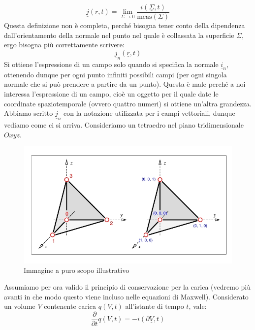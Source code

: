 \documentclass{book}
\begin{document}
        \begin{equation}
            \underline{j}(\underline{r}, t) = \lim_{\Sigma \to 0} \frac{i(\underline{\Sigma},t)}{\textrm{meas}(\Sigma)}
        \end{equation}
        Questa definizione non è completa, perché bisogna tener conto della dipendenza dall'orientamento della normale nel punto nel quale è collassata la superficie $\Sigma$, ergo bisogna più correttamente scrivere:
        \begin{equation}
            \underline{j}_{n}(\underline{r},t)
        \end{equation}
        Si ottiene l'espressione di un campo solo quando si specifica la normale $\underline{i}_{n}$, ottenendo dunque per ogni punto infiniti possibili campi (per ogni singola normale che si può prendere a partire da un punto). Questa è male perché a noi interessa l'espressione di un campo, cioè un oggetto per il quale date le coordinate spaziotemporale (ovvero quattro numeri) si ottiene un'altra grandezza. \\
        Abbiamo scritto $\underline{j}_{n}$ con la notazione utilizzata per i campi vettoriali, dunque vediamo come ci si arriva. Consideriamo un tetraedro nel piano tridimensionale $Oxyz$.
        \begin{figure}[h!]
            \centering
            \includegraphics[width=0.75\linewidth]{img//Chapter_one/Chapt1img2.png}
            \caption{Immagine a puro scopo illustrativo}
        \end{figure}
        Assumiamo per ora valido il principio di conservazione per la carica (vedremo più avanti in che modo questo viene incluso nelle equazioni di Maxwell). Considerato un volume $V$ contenente carica $q(V,t)$ all'istante di tempo $t$, vale:
        \begin{equation}
        \label{eqn:conservazione_carica}
            \frac{\partial}{\partial t}q(V,t) = - i(\partial \underline{V},t)
        \end{equation}
\end{document}
